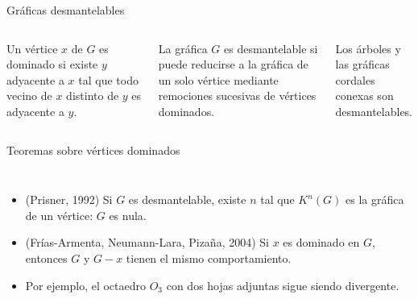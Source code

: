 \documentclass[aspectratio=169,10pt]{beamer}
\begin{document}
\begin{frame}{Gráficas desmantelables}
\begin{columns}[T,onlytextwidth]
\SmallText
Un vértice $x$ de $G$ es \alert{dominado} si existe $y$ adyacente a $x$ tal que todo vecino de $x$ distinto de $y$ es adyacente a $y$.
\par\medskip
La gráfica $G$ es \alert{desmantelable} si puede reducirse a la gráfica de un solo vértice mediante remociones sucesivas de vértices dominados.
\par\medskip
Los árboles y las gráficas cordales conexas son desmantelables.
\centering{}
\end{columns}
\end{frame}

\begin{frame}{Teoremas sobre vértices dominados}
\begin{columns}[T,onlytextwidth]
\SmallText
\begin{itemize}
\item (Prisner, 1992) Si $G$ es desmantelable, existe $n$ tal que $K^n(G)$ es la gráfica de un vértice: $G$ es \alert{nula}.
\item (Frías-Armenta, Neumann-Lara, Pizaña, 2004) Si $x$ es dominado en $G$, entonces $G$ y $G-x$ tienen el mismo comportamiento.
\item Por ejemplo, el octaedro $O_3$ con dos hojas adjuntas sigue siendo divergente.
\end{itemize}
\centering{}
\end{columns}
\end{frame}
\end{document}
